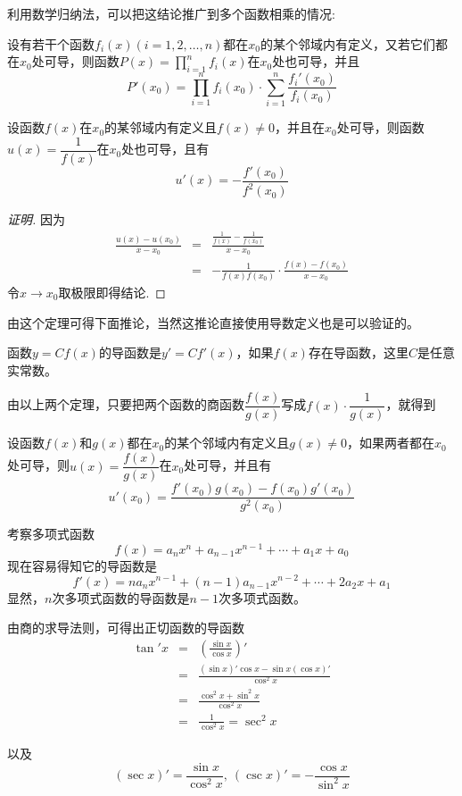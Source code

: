 利用数学归纳法，可以把这结论推广到多个函数相乘的情况:
\begin{theorem}
  设有若干个函数$f_i(x)(i=1,2,\ldots,n)$都在$x_0$的某个邻域内有定义，又若它们都在$x_0$处可导，则函数$P(x)=\prod\limits_{i=1}^nf_i(x)$在$x_0$处也可导，并且
  \[ P'(x_0) = \prod_{i=1}^nf_i(x_0) \cdot \sum_{i=1}^n \frac{f_i'(x_0)}{f_i(x_0)} \]
\end{theorem}

\begin{theorem}
  设函数$f(x)$在$x_0$的某邻域内有定义且$f(x) \neq 0$，并且在$x_0$处可导，则函数$u(x)=\dfrac{1}{f(x)}$在$x_0$处也可导，且有
  \[ u'(x) = -\frac{f'(x_0)}{f^2(x_0)} \]
\end{theorem}

\begin{proof}[证明]
  因为
  \begin{eqnarray*}
    \frac{u(x)-u(x_0)}{x-x_0} & = & \frac{\frac{1}{f(x)}-\frac{1}{f(x_0)}}{x-x_0} \\
    & = & - \frac{1}{f(x)f(x_0)} \cdot \frac{f(x)-f(x_0)}{x-x_0}
  \end{eqnarray*}
  令$x \to x_0$取极限即得结论.
\end{proof}

由这个定理可得下面推论，当然这推论直接使用导数定义也是可以验证的。
\begin{inference}
  函数$y=Cf(x)$的导函数是$y'=Cf'(x)$，如果$f(x)$存在导函数，这里$C$是任意实常数。
\end{inference}

由以上两个定理，只要把两个函数的商函数$\dfrac{f(x)}{g(x)}$写成$f(x)\cdot \dfrac{1}{g(x)}$，就得到
\begin{theorem}
  设函数$f(x)$和$g(x)$都在$x_0$的某个邻域内有定义且$g(x)\neq 0$，如果两者都在$x_0$处可导，则$u(x)=\dfrac{f(x)}{g(x)}$在$x_0$处可导，并且有
  \[ u'(x_0) = \frac{f'(x_0)g(x_0)-f(x_0)g'(x_0)}{g^2(x_0)} \]
\end{theorem}

\begin{example}
  考察多项式函数
  \[ f(x) = a_nx^n+a_{n-1}x^{n-1}+\cdots+a_1x+a_0 \]
  现在容易得知它的导函数是
  \[ f'(x) = na_nx^{n-1}+(n-1)a_{n-1}x^{n-2}+\cdots+2a_2x+a_1 \]
  显然，$n$次多项式函数的导函数是$n-1$次多项式函数。
\end{example}

\begin{example}
  由商的求导法则，可得出正切函数的导函数
  \begin{eqnarray*}
    \tan'{x} & = & \left( \frac{\sin{x}}{\cos{x}} \right)'  \\
             & = & \frac{(\sin{x})'\cos{x}-\sin{x}(\cos{x})'}{\cos^2{x}} \\
             & = & \frac{\cos^2{x}+\sin^2{x}}{\cos^2{x}} \\
    & = & \frac{1}{\cos^2{x}} = \sec^2{x}
  \end{eqnarray*}

  以及
  \[ (\sec{x})' = \frac{\sin{x}}{\cos^2{x}}, \  (\csc{x})'=-\frac{\cos{x}}{\sin^2{x}} \]
\end{example}


